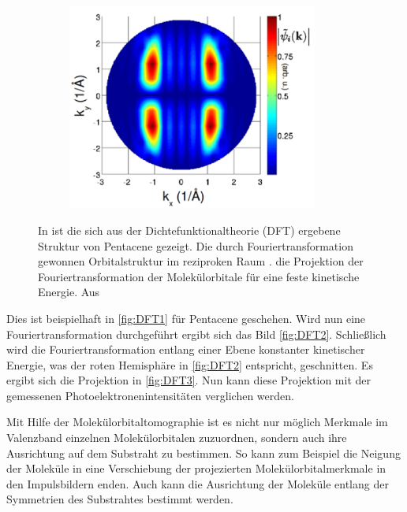 \begin{figure}
\begin{subfigure}{0.3\textwidth}
                \caption{}
                \label{fig:DFT2}
            \end{subfigure}
            \begin{subfigure}{0.3\textwidth}
                \centering
                \includegraphics[width=0.9\textwidth]{DFT3.PNG}
                \caption{}
                \label{fig:DFT3}
            \end{subfigure}
            \caption{In  ist die sich aus der Dichtefunktionaltheorie (DFT) ergebene Struktur von Pentacene gezeigt.
            Die durch Fouriertransformation gewonnen Orbitalstruktur im reziproken Raum .
             die Projektion der Fouriertransformation der Molekülorbitale für eine feste kinetische Energie.
            Aus~\cite{MM_2}}
            \label{fig:DFT}
        \end{figure}
        Dies ist beispielhaft in \autoref{fig:DFT1} für Pentacene geschehen.
        Wird nun eine Fouriertransformation durchgeführt ergibt sich das Bild \autoref{fig:DFT2}.
        Schließlich wird die Fouriertransformation entlang einer Ebene konstanter kinetischer Energie, was der roten Hemisphäre in \autoref{fig:DFT2} entspricht, geschnitten.
        Es ergibt sich die Projektion in \autoref{fig:DFT3}.
        Nun kann diese Projektion mit der gemessenen Photoelektronenintensitäten verglichen werden.

        Mit Hilfe der Molekülorbitaltomographie ist es nicht nur möglich Merkmale im Valenzband einzelnen Molekülorbitalen zuzuordnen, sondern auch ihre Ausrichtung auf dem Substraht zu bestimmen.
        So kann zum Beispiel die Neigung der Moleküle in eine Verschiebung der projezierten Molekülorbitalmerkmale in den Impulsbildern enden.
        Auch kann die Ausrichtung der Moleküle entlang der Symmetrien des Substrahtes bestimmt werden.

